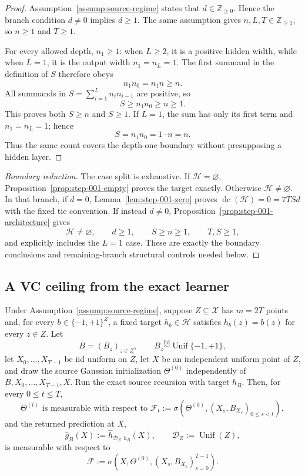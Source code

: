 \begin{proof}
Assumption~\ref{assump:source-regime} states that
$d\in\mathbb Z_{\geq 0}$.  Hence the branch condition $d\neq 0$ implies
$d\geq 1$.  The same assumption gives $n,L,T\in\mathbb Z_{\geq 1}$, so
$n\geq 1$ and $T\geq 1$.

For every allowed depth, $n_1\geq 1$: when $L\geq 2$, it is a positive
hidden width, while when $L=1$, it is the output width $n_1=n_L=1$.
The first summand in the definition of $S$ therefore obeys
\[
n_1n_0=n_1n\geq n.
\]
All summands in $S=\sum_{i=1}^L n_i n_{i-1}$ are positive, so
\[
S\geq n_1n_0\geq n\geq 1.
\]
This proves both $S\geq n$ and $S\geq 1$.  If $L=1$, the sum has only
its first term and $n_1=n_L=1$; hence
\[
S=n_1n_0=1\cdot n=n.
\]
Thus the same count covers the depth-one boundary without presupposing a
hidden layer.
\end{proof}

\begin{proof}[Boundary reduction]
The case split is exhaustive.  If $\mathcal H=\varnothing$,
Proposition~\ref{prop:step-001-empty} proves the target exactly.  Otherwise
$\mathcal H\neq\varnothing$.  In that branch, if $d=0$,
Lemma~\ref{lem:step-001-zero} proves
$\operatorname{dc}(\mathcal H)=0=7TSd$ with the fixed tie convention.  If
instead $d\neq 0$, Proposition~\ref{prop:step-001-architecture} gives
\[
\mathcal H\neq\varnothing,\qquad d\geq 1,\qquad S\geq n\geq 1,
\qquad T,S\geq 1,
\]
and explicitly includes the $L=1$ case.  These are exactly the boundary
conclusions and remaining-branch structural controls needed below.
\end{proof}

\subsection{A VC ceiling from the exact learner}
\label{app:step-002}

\begin{lemma}
\label{lem:step-002-label-access}
Under Assumption~\ref{assump:source-regime}, suppose $Z\subseteq\mathcal X$
has $m=2T$ points and, for every $b\in\{-1,+1\}^{Z}$, a fixed target
$h_b\in\mathcal H$ satisfies $h_b(z)=b(z)$ for every $z\in Z$.  Let
\[
B=(B_z)_{z\in Z},\qquad B_z\stackrel{\mathrm{iid}}{\sim}
\operatorname{Unif}\{-1,+1\},
\]
let $X_0,\ldots,X_{T-1}$ be iid uniform on $Z$, let $X$ be an independent
uniform point of $Z$, and draw the source Gaussian initialization
$\Theta^{(0)}$ independently of $B,X_0,\ldots,X_{T-1},X$.  Run the exact
source recursion with target $h_B$.  Then, for every $0\leq t\leq T$,
\[
\Theta^{(t)}\text{ is measurable with respect to }
\mathscr F_t:=\sigma\!\left(\Theta^{(0)},(X_s,B_{X_s})_{0\leq s<t}\right),
\]
and the returned prediction at $X$,
\[
\widehat g_B(X):=\widehat h_{\mathcal D_Z,h_B}(X),
\qquad \mathcal D_Z:=\operatorname{Unif}(Z),
\]
is measurable with respect to
\[
\mathscr F:=\sigma\!\left(X,\Theta^{(0)},(X_s,B_{X_s})_{s=0}^{T-1}\right).
\]
\end{lemma}

